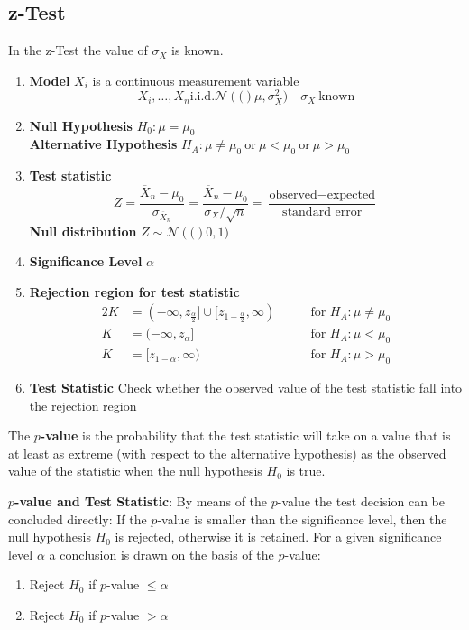\documentclass[11pt]{article}
\theoremstyle{definition}
\newcommand*\samplemean[1]{\overline{#1}}
\newcommand*\N[1]{\mathcal{N}\left(#1\right)}
\begin{document}
\subsection{z-Test}
In the z-Test the value of $\sigma_X$ is known.
\begin{enumerate}
	\item \textbf{Model} $X_i$ is a continuous measurement variable
	\begin{equation*}
		X_i, \dots, X_n \text{i.i.d.} \N(\mu, \sigma_X^2)\quad \sigma_X\ \text{known}
	\end{equation*}
	\item \textbf{Null Hypothesis} $H_0: \mu = \mu_0$\\ \textbf{Alternative Hypothesis} $H_A: \mu \neq \mu_0\ \text{or}\ \mu < \mu_0\ \text{or}\ \mu > \mu_0$
	\item \textbf{Test statistic}
	\begin{equation*}
		Z = \frac{\samplemean{X}_n - \mu_0}{\sigma_{\samplemean{X}_n}} = \frac{\samplemean{X}_n - \mu_0}{\sigma_X / \sqrt{n}} = \frac{\text{observed} - \text{expected}}{\text{standard error}}
	\end{equation*}
	\textbf{Null distribution} $Z \sim \N(0,1)$
	\item \textbf{Significance Level} $\alpha$
	\item \textbf{Rejection region for test statistic}
	\begin{alignat*}{2}
		K &= (-\infty,z_{\frac{\alpha}{2}}] \cup [z_{1-\frac{\alpha}{2}}, \infty) &\qquad \text{for } H_A : \mu\neq \mu_0\\
		K &= (-\infty, z_\alpha] &\qquad \text{for } H_A : \mu < \mu_0\\
		K &= [ z_{1-\alpha}, \infty ) &\qquad \text{for } H_A : \mu > \mu_0
	\end{alignat*}
	\item \textbf{Test Statistic} Check whether the observed value of the test statistic fall into the rejection region
\end{enumerate}

\begin{definition}
	The \textbf{$p$-value} is the probability that the test statistic will take on a value that is at least as extreme (with respect to the alternative hypothesis) as the observed value of the statistic when the null hypothesis $H_0$ is true.
\end{definition}

\begin{definition}
	\textbf{$p$-value and Test Statistic}: By means of the $p$-value the test decision can be concluded directly: If the $p$-value is smaller than the significance level, then  the null hypothesis $H_0$ is rejected, otherwise it is retained. For a given significance level $\alpha$ a conclusion is drawn on the basis of the $p$-value:
	\begin{enumerate}
		\item Reject $H_0$ if $p$-value $\leq \alpha$
		\item Reject $H_0$ if $p$-value $> \alpha$
	\end{enumerate}
\end{definition}
\end{document}
